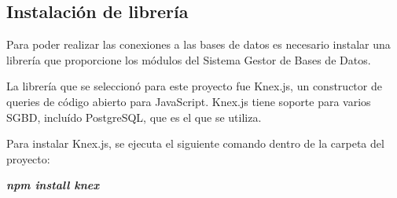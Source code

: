 \subsection{Instalación de librería}
Para poder realizar las conexiones a las bases de datos es necesario instalar una librería que proporcione los módulos del Sistema Gestor de Bases de Datos.

La librería que se seleccionó para este proyecto fue Knex.js, un constructor de queries de código abierto para JavaScript. Knex.js tiene soporte para varios SGBD, incluído PostgreSQL, que es el que se utiliza.

Para instalar Knex.js, se ejecuta el siguiente comando dentro de la carpeta del proyecto:
    \begin{center}
        \textbf{
            \emph{
                npm install knex
                }
            }
    \end{center}